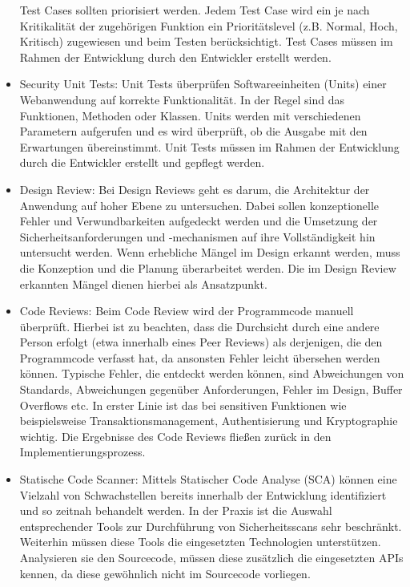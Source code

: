 \documentclass[12pt,oneside,a4paper,parskip]{scrbook}
\begin{document}
\begin{itemize}
    Test Cases sollten priorisiert werden. Jedem Test Case wird ein je nach Kritikalität der zugehörigen
    Funktion ein Prioritätslevel (z.B. Normal, Hoch, Kritisch) zugewiesen und beim Testen
    berücksichtigt.
    Test Cases müssen im Rahmen der Entwicklung durch den Entwickler erstellt werden.
    \item Security Unit Tests:
    Unit Tests überprüfen Softwareeinheiten (Units) einer Webanwendung auf korrekte Funktionalität.
    In der Regel sind das Funktionen, Methoden oder Klassen. Units werden mit verschiedenen
    Parametern aufgerufen und es wird überprüft, ob die Ausgabe mit den Erwartungen
    übereinstimmt.
    Unit Tests müssen im Rahmen der Entwicklung durch die Entwickler erstellt und gepflegt werden.
    \item Design Review:
    Bei Design Reviews geht es darum, die Architektur der Anwendung auf hoher Ebene zu
    untersuchen. Dabei sollen konzeptionelle Fehler und Verwundbarkeiten aufgedeckt werden und
    die Umsetzung der Sicherheitsanforderungen und -mechanismen auf ihre Vollständigkeit hin
    untersucht werden. Wenn erhebliche Mängel im Design erkannt werden, muss die Konzeption und die Planung überarbeitet werden. Die im Design Review erkannten Mängel dienen hierbei als Ansatzpunkt.
    \item Code Reviews:
    Beim Code Review wird der Programmcode manuell überprüft. Hierbei ist zu beachten, dass die
    Durchsicht durch eine andere Person erfolgt (etwa innerhalb eines Peer Reviews) als derjenigen, die
    den Programmcode verfasst hat, da ansonsten Fehler leicht übersehen werden können. Typische
    Fehler, die entdeckt werden können, sind Abweichungen von Standards, Abweichungen gegenüber
    Anforderungen, Fehler im Design, Buffer Overflows etc. In erster Linie ist das bei sensitiven
    Funktionen wie beispielsweise Transaktionsmanagement, Authentisierung und Kryptographie
    wichtig. Die Ergebnisse des Code Reviews fließen zurück in den Implementierungsprozess.
    \item Statische Code Scanner:
    Mittels Statischer Code Analyse (SCA) können eine Vielzahl von Schwachstellen bereits innerhalb
    der Entwicklung identifiziert und so zeitnah behandelt werden. In der Praxis ist die Auswahl
    entsprechender Tools zur Durchführung von Sicherheitsscans sehr beschränkt. Weiterhin müssen
    diese Tools die eingesetzten Technologien unterstützen. Analysieren sie den Sourcecode, müssen
    diese zusätzlich die eingesetzten APIs kennen, da diese gewöhnlich nicht im Sourcecode vorliegen.

\end{itemize}
\end{document}
